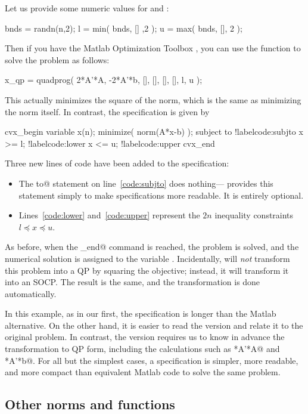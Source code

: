 \documentclass[12pt]{article}
\begin{document}
Let us provide some numeric values for \verb@l@ and \verb@u@:
\begin{code2}[firstnumber=47]
	bnds = randn(n,2);
	l = min( bnds, [] ,2 );
	u = max( bnds, [], 2 );
\end{code2}
Then if you have the Matlab
Optimization Toolbox \cite{MATOPT}, you can use the \verb@quadprog@ function
to solve the problem as follows:
\begin{code2}[firstnumber=53]
	x_qp = quadprog( 2*A'*A, -2*A'*b, [], [], [], [], l, u );
\end{code2}
This actually minimizes the square of the norm, which is the same as
minimizing the norm itself. In contrast, the \cvx specification is given by
\begin{code2}[firstnumber=59]
	cvx_begin
	    variable x(n);
	    minimize( norm(A*x-b) );
	    subject to			!label{code:subjto}
	        x >= l;			!label{code:lower}
	        x <= u;			!label{code:upper}
	cvx_end
\end{code2}
Three new lines of \cvx code have been added to the \cvx specification:
\begin{itemize}
\item The \verb@subject to@ statement on line~\ref{code:subjto} does nothing---\cvx
provides this statement simply to make specifications more readable. 
It is entirely optional.
\item Lines~\ref{code:lower} and~\ref{code:upper}
represent the $2n$ inequality constraints $l \preceq x \preceq u$.
\end{itemize}
As before, when the \verb@cvx_end@ command is reached, the problem
is solved, and the numerical solution is assigned to the variable
\verb@x@. Incidentally, \cvx will 
\emph{not} transform this problem into a QP by squaring the objective;
instead, it will transform it
into an SOCP. The result is the same, and the transformation
is done automatically.

In this example, as in our first, the \cvx specification is 
longer than the Matlab alternative. On the other hand, it is easier
to read the \cvx version and relate it to the original problem.
In contrast, the \verb@quadprog@ version requires us to know in advance
the transformation to QP form, including the calculations
such as *A'*A@ and *A'*b@.
For all but the simplest cases, a \cvx
specification is simpler, more readable, and more compact than
equivalent Matlab code to solve the same problem.

\subsection{Other norms and functions}
\label{sec:othernorms}
\end{document}
